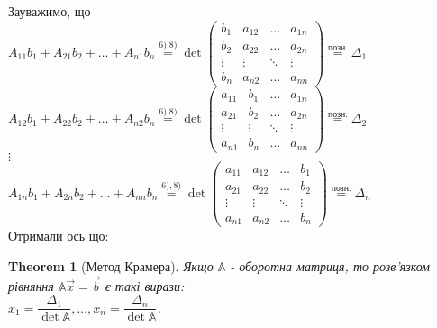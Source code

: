 \documentclass[a4paper, 10pt]{article}
\theoremstyle{theoremdd}
\newtheorem{theorem}{Theorem}[subsection]
\begin{document}
Зауважимо, що\\
$A_{11}b_1 + A_{21}b_2 + \dots + A_{n1}b_n \overset{\textrm{6),8)}}{=} \det \begin{pmatrix}
b_1  & a_{12} & \dots & a_{1n} \\
b_2 & a_{22} & \dots & a_{2n} \\
\vdots & \vdots & \ddots & \vdots \\
b_n & a_{n2} & \dots & a_{nn}
\end{pmatrix} \overset{\text{позн.}}{=} \Delta_1$\\
$A_{12}b_1 + A_{22}b_2 + \dots + A_{n2}b_n \overset{\textrm{6),8)}}{=} \det \begin{pmatrix}
a_{11}  & b_1 & \dots & a_{1n} \\
a_{21} & b_2 & \dots & a_{2n} \\
\vdots & \vdots & \ddots & \vdots \\
a_{n1} & b_n & \dots & a_{nn}
\end{pmatrix} \overset{\text{позн.}}{=} \Delta_2$\\
$\vdots$\\
$A_{1n}b_1 + A_{2n}b_2 + \dots + A_{nn}b_n \overset{6),8)}{=} \det \begin{pmatrix}
a_{11}  & a_{12} & \dots & b_1 \\
a_{21} & a_{22} & \dots & b_2 \\
\vdots & \vdots & \ddots & \vdots \\
a_{n1} & a_{n2} & \dots & b_n
\end{pmatrix} \overset{\text{позн.}}{=} \Delta_n$\\
Отримали ось що:
\begin{theorem}[Метод Крамера]
Якщо $\mathbb{A}$ - оборотна матриця, то розв'язком рівняння $\mathbb{A} \vec{x} = \vec{b}$ є такі вирази: \\
$x_1 = \dfrac{\Delta_1}{\det \mathbb{A}}, \dots, x_n = \dfrac{\Delta_n}{\det \mathbb{A}}$.
\end{theorem}
\end{document}
